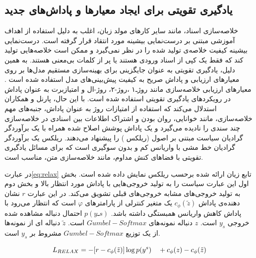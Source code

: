 \subsection{یادگیری تقویتی برای ایجاد معیارها و پاداش‌های جدید}

خلاصه‌سازی اسناد، مانند سایر کارهای مولد زبان، اغلب به دلیل استفاده از اهداف آموزشی مبتنی بر درست‌نمایی بیشینه
مورد انتقاد قرار گرفته است.
درست‌نمایی بیشینه کیفیت خلاصه‌ی تولید شده را در نظر نمی‌گیرد و ممکن است خلاصه‌هایی تولید کند که فقط یک کپی از اسناد ورودی هستند یا پر از کلمات بی‌معنی هستند. به همین دلیل، یادگیری تقویتی به عنوان جایگزینی برای بهینه‌سازی مستقیم مدل‌ها بر روی معیارهای ارزیابی و پاداش صریح به کیفیت پیش‌بینی‌های مدل استفاده شده است	\cite{Parnell2022AMC}. 
معیارهای ارزیابی خلاصه‌سازی مانند روژـ۱
،روژ-۲،
روژ-‌ال
و امتیازبرت
به عنوان پاداش در رویکردهای یادگیری تقویتی استفاده شده است. با این حال، پارنل و همکاران استدلال می‌کند که استفاده از امتیازات روژ به عنوان پاداش، جنبه‌های مهم خلاصه‌سازی، مانند خوانایی، روان بودن و اشتراک اطلاعات بین اسنادی در خلاصه‌سازی چند سندی را نادیده می‌گیرد و یک پاداش پوشش اصلاح شده همراه با یک برآوردگر گرادیان سیاست مبتنی بر اصول (ریلکس )	 
را پیشنهاد می‌دهند\cite{Parnell2022AMC, ALOMARI}.
ریلکس یک برآوردگر گرادیان خط مشی
با واریانس کم و بدون سوگیری
است که برای مسائل یادگیری تقویتی با فضاهای کنش مداوم، مانند خلاصه‌سازی متن، مناسب است\cite{Grathwohl2017BackpropagationTT}.

در عبارت\ref {eq:relax} تابع زیان ارائه شده برحسب ریلکس نمایش داده شده است.
بخش اول این عبارت سیاست را به تولید خروجی‌هایی با پاداش مورد انتظار بالا و بخش دوم به تولید خروجی‌‌های مشابه خروجی‌های قبلی 
تشویق می‌کند.
در این عبارت
$ r $
نشان دهنده‌ی پاداش 
$ c_\phi(\tilde{z}) $
یک متغیر کنترلی از پارامترهای $ φ $ است که انتظار می‌رود با پاداش کاهش واریانس همبستگی داشته باشد.
$ p(yـs) $ 
احتمال دنباله مشاهده شده خروجی $ y_s $ است.
$ z $
دنباله نمونه‌های $Gumbel-Softmax $ است.
$ \tilde{z} $
دنباله ای از نمونه‌ها از یک توزیع $ Gumbel-Softmax $ مشروط بر $ y_s $ است.


\begin{equation}
	\label{eq:relax}
	L_\text{$ RELAX $} = -[r - c_\phi(\tilde{z})] \log p(y^{s}) \quad + c_\phi(z) - c_\phi(\tilde{z})
\end{equation}


